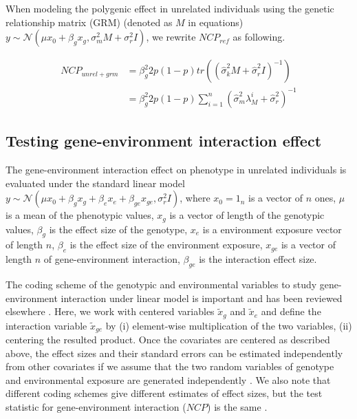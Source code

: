 \documentclass[]{book}
\begin{document}
When modeling the polygenic effect in unrelated individuals using the
genetic relationship matrix (GRM) (denoted as \(M\) in equations)
\(y \sim \mathcal{N} (\mu x_0 + \beta_g x_g, \sigma_m^2 M + \sigma_r^2 I)\),
we rewrite \(NCP_{ref}\) as following.

\begin{equation}
\begin{split}
NCP_{unrel+grm} & = \beta_g^2 2 p (1 - p) tr( (\hat{\sigma}_k^2 M + \hat{\sigma}_r^2 I)^{-1} )  \\
 & = \beta_g^2 2 p (1 - p) \sum_{i=1}^{n}{(\hat{\sigma}_m^2 \lambda_{M}^i + \hat{\sigma}_r^2)^{-1}}
\end{split}
\label{eq:ncpggrm}
\end{equation}

\subsection{Testing gene-environment interaction
effect}\label{testing-gene-environment-interaction-effect}

The gene-environment interaction effect on phenotype in unrelated
individuals is evaluated under the standard linear model
\(y \sim \mathcal{N} (\mu x_0 + \beta_g x_g + \beta_e x_e + \beta_{ge} x_{ge}, \sigma_r^2 I)\),
where \(x_0 = 1_n\) is a vector of \(n\) ones, \(\mu\) is a mean of the
phenotypic values, \(x_g\) is a vector of length of the genotypic
values, \(\beta_g\) is the effect size of the genotype, \(x_e\) is a
environment exposure vector of length \(n\), \(\beta_e\) is the effect
size of the environment exposure, \(x_{ge}\) is a vector of length \(n\)
of gene-environment interaction, \(\beta_{ge}\) is the interaction
effect size.

The coding scheme of the genotypic and environmental variables to study
gene-environment interaction under linear model is important and has
been reviewed elsewhere \citep{Aschard2016}. Here, we work with centered
variables \(\tilde{x}_g\) and \(\tilde{x}_e\) and define the interaction
variable \(\tilde{x}_{ge}\) by (i) element-wise multiplication of the
two variables, (ii) centering the resulted product. Once the covariates
are centered as described above, the effect sizes and their standard
errors can be estimated independently from other covariates if we assume
that the two random variables of genotype and environmental exposure are
generated independently \citep[Appendix C]{Aschard2016}. We also note
that different coding schemes give different estimates of effect sizes,
but the test statistic for gene-environment interaction (\(NCP\)) is the
same \citep[Appendix B]{Aschard2016}.
\end{document}
